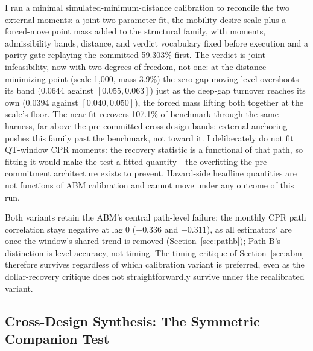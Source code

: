 \documentclass[12pt]{article}
\begin{document}
I ran a minimal simulated-minimum-distance calibration to reconcile the two external moments: a joint two-parameter fit, the mobility-desire scale plus a forced-move point mass added to the structural family, with moments, admissibility bands, distance, and verdict vocabulary fixed before execution and a parity gate replaying the committed 59.303\% first. The verdict is joint infeasibility, now with two degrees of freedom, not one: at the distance-minimizing point (scale 1{,}000, mass 3.9\%) the zero-gap moving level overshoots its band (0.0644 against $[0.055, 0.063]$) just as the deep-gap turnover reaches its own (0.0394 against $[0.040, 0.050]$), the forced mass lifting both together at the scale's floor. The near-fit recovers 107.1\% of benchmark through the same harness, far above the pre-committed cross-design bands: external anchoring pushes this family past the benchmark, not toward it. I deliberately do not fit QT-window CPR moments: the recovery statistic is a functional of that path, so fitting it would make the test a fitted quantity---the overfitting the pre-commitment architecture exists to prevent. Hazard-side headline quantities are not functions of ABM calibration and cannot move under any outcome of this run.

Both variants retain the ABM's central path-level failure: the monthly CPR path correlation stays negative at lag 0 ($-0.336$ and $-0.311$), as all estimators' are once the window's shared trend is removed (Section~\ref{sec:pathb}); Path B's distinction is level accuracy, not timing. The timing critique of Section~\ref{sec:abm} therefore survives regardless of which calibration variant is preferred, even as the dollar-recovery critique does not straightforwardly survive under the recalibrated variant.

\subsection{Cross-Design Synthesis: The Symmetric Companion Test}\label{sec:robustness-synthesis}
\end{document}
